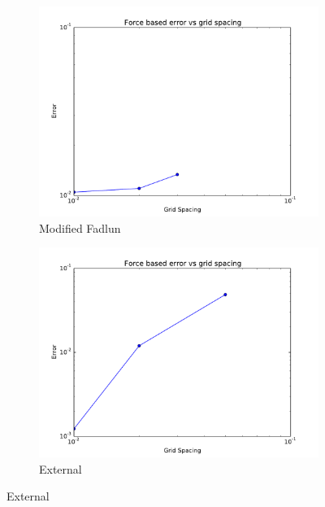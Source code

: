 \begin{figure}[H]
	\centering
	\begin{subfigure}{0.5\textwidth}
		\includegraphics[width=\linewidth]{error_fadlun}
		\caption{Modified Fadlun}
	\end{subfigure}
	
	\begin{subfigure}{0.5\textwidth}
		\includegraphics[width=\linewidth]{error_external}
		\caption{External}
	\end{subfigure}
	

\end{figure}
